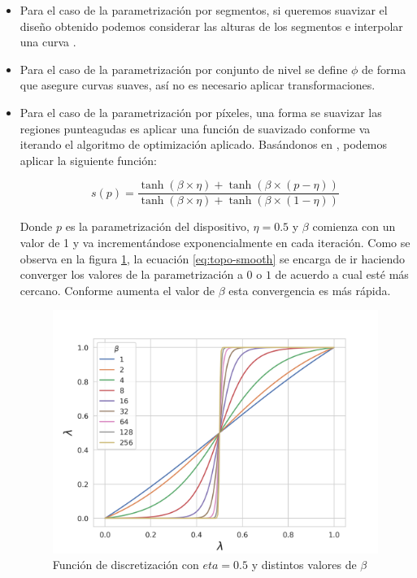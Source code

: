 \begin{itemize}
  \item Para el caso de la parametrización por segmentos, si queremos suavizar el diseño obtenido podemos considerar las alturas de los segmentos e interpolar una curva \citep{Yangjin2013}.

  \item Para el caso de la parametrización por conjunto de nivel se define $\phi$ de forma que asegure curvas suaves, así no es necesario aplicar transformaciones.

  \item Para el caso de la parametrización por píxeles, una forma se suavizar las regiones punteagudas es aplicar una función de suavizado conforme va iterando el algoritmo de optimización aplicado. Basándonos en \cite{Zhang2021}, podemos aplicar la siguiente función:

\begin{equation}
  s(p) = \frac{\tanh (\beta \times \eta) + \tanh (\beta \times (p - \eta))}{\tanh (\beta \times \eta) + \tanh (\beta \times (1 - \eta))}
  \label{eq:topo-smooth}
\end{equation}

    Donde $p$ es la parametrización del dispositivo, $\eta = 0.5$ y $\beta$ comienza con un valor de 1 y va incrementándose exponencialmente en cada iteración. 
    Como se observa en la figura \ref{fig:discretization}, la ecuación \ref{eq:topo-smooth} se encarga de ir haciendo converger los valores de la parametrización a $0$ o $1$ de acuerdo a cual esté más cercano. 
    Conforme aumenta el valor de $\beta$ esta convergencia es más rápida.

    \begin{figure}[ht]
      \centering
      \includegraphics[scale=0.8]{image/theory/discretization.png}
      \caption{Función de discretización con $eta = 0.5$ y distintos valores de $\beta$}
      \label{fig:discretization}
    \end{figure}

\end{itemize}

